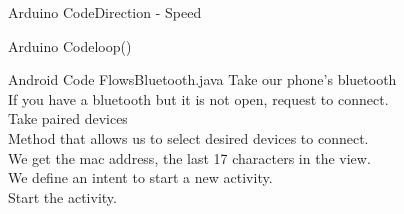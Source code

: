 \documentclass[xcolor=table, 9pt]{beamer}
\begin{document}
\begin{frame}{Arduino Code}{Direction - Speed}
\begin{block}{}
\lstIII
\end{block}
\end{frame}

\begin{frame}{Arduino Code}{loop()}
\begin{block}{}
\lstIIII
\end{block}
\end{frame}




\begin{frame}{Android Code Flows}{Bluetooth.java}
{} Take our phone's bluetooth\\
\vspace{0.3cm}
{} If you have a bluetooth but it is not open, request to connect.\\
\vspace{0.3cm}
{} Take paired devices\\
\vspace{0.3cm}
{} Method that allows us to select desired devices to connect.\\
\vspace{0.3cm}
{} We get the mac address, the last 17 characters in the view.\\
\vspace{0.3cm}
{} We define an intent to start a new activity.\\
\vspace{0.3cm}
{} Start the activity.
\end{frame}
\end{document}
